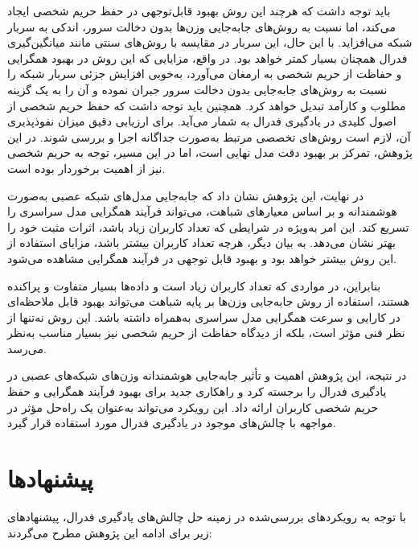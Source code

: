 
باید توجه داشت که هرچند این روش بهبود قابل‌توجهی در حفظ حریم شخصی ایجاد می‌کند، اما نسبت به روش‌های جابه‌جایی وزن‌ها بدون دخالت سرور، اندکی به سربار شبکه می‌افزاید. با این حال، این سربار در مقایسه با روش‌های سنتی مانند میانگین‌گیری فدرال همچنان بسیار کمتر خواهد بود. در واقع، مزایایی که این روش در بهبود همگرایی و حفاظت از حریم شخصی به ارمغان می‌آورد، به‌خوبی افزایش جزئی سربار شبکه را نسبت به روش‌های جابه‌جایی بدون دخالت سرور جبران نموده و آن را به یک گزینه مطلوب و کارآمد تبدیل خواهد کرد.
همچنین باید توجه داشت که حفظ حریم شخصی از اصول کلیدی در یادگیری فدرال به شمار می‌آید. برای ارزیابی دقیق میزان نفوذپذیری آن، لازم است روش‌های تخصصی مرتبط به‌صورت جداگانه اجرا و بررسی شوند. در این پژوهش، تمرکز بر بهبود دقت مدل نهایی است، اما در این مسیر، توجه به حریم شخصی نیز از اهمیت برخوردار بوده است.

در نهایت، این پژوهش نشان داد که جابه‌جایی مدل‌های شبکه عصبی به‌صورت هوشمندانه و بر اساس معیارهای شباهت، می‌تواند فرآیند همگرایی مدل سراسری را تسریع کند. این امر به‌ویژه در شرایطی که تعداد کاربران زیاد باشد، اثرات مثبت خود را بهتر نشان می‌دهد. به بیان دیگر، هرچه تعداد کاربران بیشتر باشد، مزایای استفاده از این روش بیشتر خواهد بود و بهبود قابل توجهی در فرآیند همگرایی مشاهده می‌شود.

بنابراین، در مواردی که تعداد کاربران زیاد است و داده‌ها بسیار متفاوت و پراکنده هستند، استفاده از روش‌ جابه‌جایی وزن‌ها بر پایه شباهت می‌تواند بهبود قابل ملاحظه‌ای در کارایی و سرعت همگرایی مدل سراسری به‌همراه داشته باشد. این روش نه‌تنها از نظر فنی مؤثر است، بلکه از دیدگاه حفاظت از حریم شخصی نیز بسیار مناسب به‌نظر می‌رسد.

در نتیجه، این پژوهش اهمیت و تأثیر جابه‌جایی هوشمندانه وزن‌های شبکه‌های عصبی در یادگیری فدرال را برجسته کرد و راهکاری جدید برای بهبود فرآیند همگرایی و حفظ حریم شخصی کاربران ارائه داد. این رویکرد می‌تواند به‌عنوان یک راه‌حل مؤثر در مواجهه با چالش‌های موجود در یادگیری فدرال مورد استفاده قرار گیرد.



\section{پیشنهادها}
با توجه به رویکردهای بررسی‌شده در زمینه حل چالش‌های یادگیری فدرال، پیشنهادهای زیر برای ادامه این پژوهش مطرح می‌گردند:

